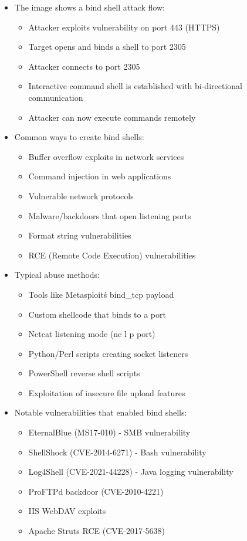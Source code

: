 \begin{itemize}
    \item The image shows a bind shell attack flow:
    \begin{itemize}
        \tightlist
		\item Attacker exploits vulnerability on port 443 (HTTPS)
		\item Target opens and binds a shell to port 2305
		\item Attacker connects to port 2305
		\item Interactive command shell is established with bi-directional communication
		\item Attacker can now execute commands remotely
    \end{itemize}

	\item Common ways to create bind shells:
    \begin{itemize}
        \tightlist
		\item Buffer overflow exploits in network services
		\item Command injection in web applications
		\item Vulnerable network protocols
		\item Malware/backdoors that open listening ports
		\item Format string vulnerabilities
		\item RCE (Remote Code Execution) vulnerabilities
    \end{itemize}

    \item Typical abuse methods:
    \begin{itemize}
        \tightlist
        \item Tools like Metasploit\'s bind\_tcp payload
        \item Custom shellcode that binds to a port
        \item Netcat listening mode (nc \-l \-p port)
        \item Python/Perl scripts creating socket listeners
        \item PowerShell reverse shell scripts
        \item Exploitation of insecure file upload features
    \end{itemize}

	\item Notable vulnerabilities that enabled bind shells:
    \begin{itemize}
        \tightlist
		\item EternalBlue (MS17-010) - SMB vulnerability
		\item ShellShock (CVE-2014-6271) - Bash vulnerability
		\item Log4Shell (CVE-2021-44228) - Java logging vulnerability
		\item ProFTPd backdoor (CVE-2010-4221)
		\item IIS WebDAV exploits
		\item Apache Struts RCE (CVE-2017-5638)
    \end{itemize}


\end{itemize}
